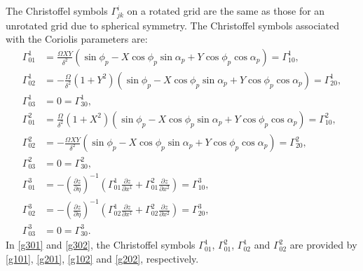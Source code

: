 \documentclass{article}
\begin{document}
The Christoffel symbols $\Gamma^i_{jk}$ on a rotated grid are the same as those for an unrotated grid due to spherical symmetry. The Christoffel symbols associated with the Coriolis parameters are:
\begin{align}
\Gamma^1_{01}&=\frac{\Omega XY}{\delta^2}\left( \sin\phi_p -X\cos\phi_p\sin\alpha_p+Y\cos\phi_p\cos\alpha_p \right)=\Gamma^1_{10}, \label{g101}\\
\Gamma^1_{02}&=-\frac{\Omega}{\delta^2}(1+Y^2)(\sin\phi_p-X\cos\phi_p\sin\alpha_p+Y\cos\phi_p\cos\alpha_p)=\Gamma^1_{20}, \label{g102} \\
\Gamma^1_{03}&=0=\Gamma^1_{30}, \\
\Gamma^2_{01}&=\frac{\Omega}{\delta^2}(1+X^2)(\sin\phi_p-X\cos\phi_p\sin\alpha_p+Y\cos\phi_p\cos\alpha_p)=\Gamma^2_{10}, \label{g201} \\
\Gamma^2_{02}&=-\frac{\Omega XY}{\delta^2} \left( \sin\phi_p-X\cos\phi_p\sin\alpha_p+Y\cos\phi_p\cos\alpha_p \right)=\Gamma^2_{20}, \label{g202} \\
\Gamma^2_{03}&=0=\Gamma^2_{30}, \\
\Gamma^3_{01}&=-\left( \frac{\partial z}{\partial \eta} \right)^{-1} \left( \Gamma^1_{01}\frac{\partial z}{\partial x^1} + \Gamma^2_{01}\frac{\partial z}{\partial x^2} \right)=\Gamma^3_{10}, \label{g301} \\
\Gamma^3_{02}&=-\left( \frac{\partial z}{\partial \eta} \right)^{-1} \left( \Gamma^1_{02}\frac{\partial z}{\partial x^1} + \Gamma^2_{02}\frac{\partial z}{\partial x^2} \right)=\Gamma^3_{20}, \label{g302} \\
\Gamma^3_{03}&=0=\Gamma^3_{30}.
\end{align}
In \eqref{g301} and \eqref{g302}, the Christoffel symbols $\Gamma^1_{01}$, $\Gamma^2_{01}$, $\Gamma^1_{02}$ and $\Gamma^2_{02}$ are provided by \eqref{g101}, \eqref{g201}, \eqref{g102} and \eqref{g202}, respectively.
\end{document}
